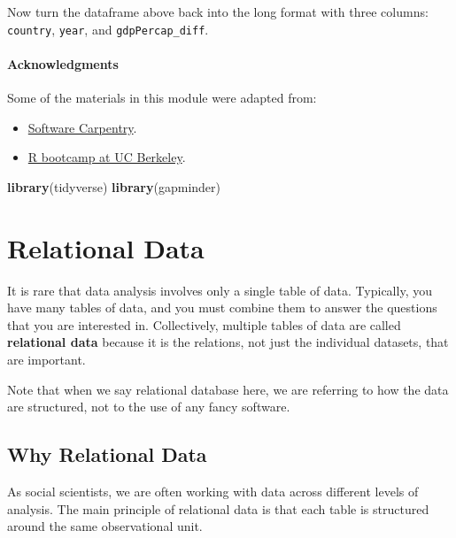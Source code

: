 \documentclass[]{book}
\newenvironment{Shaded}{\begin{snugshade}}{\end{snugshade}}
\newcommand{\KeywordTok}[1]{\textcolor[rgb]{0.13,0.29,0.53}{\textbf{#1}}}
\newcommand{\NormalTok}[1]{#1}
\providecommand{\tightlist}{%
  \setlength{\itemsep}{0pt}\setlength{\parskip}{0pt}}
\begin{document}
Now turn the dataframe above back into the long format with three
columns: \texttt{country}, \texttt{year}, and \texttt{gdpPercap\_diff}.

\subsubsection*{Acknowledgments}\label{acknowledgments-3}

Some of the materials in this module were adapted from:

\begin{itemize}
\tightlist
\item
  \href{http://swcarpentry.github.io/r-novice-gapminder/}{Software
  Carpentry}.
\item
  \href{https://github.com/berkeley-scf/r-bootcamp-fall-2019}{R bootcamp
  at UC Berkeley}.
\end{itemize}

\begin{Shaded}
\begin{Highlighting}[]
\KeywordTok{library}\NormalTok{(tidyverse)}
\KeywordTok{library}\NormalTok{(gapminder)}
\end{Highlighting}
\end{Shaded}

\chapter{Relational Data}\label{relational-data}

It is rare that data analysis involves only a single table of data.
Typically, you have many tables of data, and you must combine them to
answer the questions that you are interested in. Collectively, multiple
tables of data are called \textbf{relational data} because it is the
relations, not just the individual datasets, that are important.

Note that when we say relational database here, we are referring to how
the data are structured, not to the use of any fancy software.

\section{Why Relational Data}\label{why-relational-data}

As social scientists, we are often working with data across different
levels of analysis. The main principle of relational data is that each
table is structured around the same observational unit.
\end{document}
